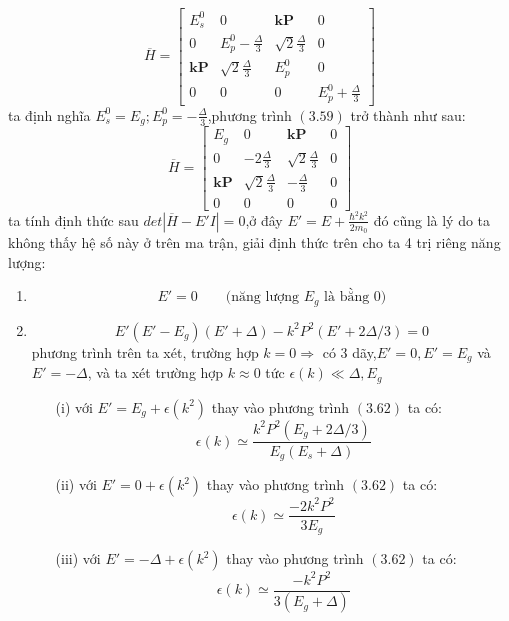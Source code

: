 \begin{equation}
\overline{H}=
\begin{bmatrix}
E_s^0  &0 &\mathbf{kP}  &0 \\
0& E_p^0 -\frac{\Delta}{3} &\sqrt{2}\frac{\Delta}{3} &0 \\
\mathbf{kP} &\sqrt{2}\frac{\Delta}{3} &E_p^0 &0 \\
0 &0 &0 &E_p^0+\frac{\Delta}{3} 
\end{bmatrix}
\end{equation}
ta định nghĩa $E_s^0=E_g;E_p^0=-\frac{\Delta}{3}$,phương trình $(3.59)$ trở thành như sau:
\begin{equation}
\overline{H}=
\begin{bmatrix}
E_g  &0 &\mathbf{kP}  &0 \\
0 &-2\frac{\Delta}{3} &\sqrt{2}\frac{\Delta}{3} &0 \\
\mathbf{kP} &\sqrt{2}\frac{\Delta}{3} &-\frac{\Delta}{3} &0 \\
0 &0 &0 &0 
\end{bmatrix}
\end{equation}
ta tính định thức sau $det|\overline{H}-E'I|=0$,ở đây $E'=E+\frac{\hbar^2 k^2}{2m_0}$ đó cũng là lý do ta không thấy hệ số này ở trên ma trận, giải định thức trên cho ta 4 trị riêng năng lượng:
\begin{enumerate}
\item \begin{equation}
E'=0 \qquad \text{(năng lượng $E_g$ là bằng 0)}
\end{equation}
\item \begin{equation}
E'(E'-E_g)(E'+\Delta) -k^2P^2(E'+2\Delta /3) =0
\end{equation}
phương trình trên ta xét, trường hợp $k=0 \Longrightarrow $ có 3 dãy,$E'=0,E'=E_g$ và $E'=-\Delta$, và ta xét trường hợp $k\approx0$ tức $\epsilon(k) \ll \Delta,E_g$
\begin{itemize}
\item[(i)] với $E'=E_g + \epsilon(k^2)$ thay vào phương trình $(3.62)$ ta có:
\begin{equation}
\epsilon(k) \simeq \frac{k^2P^2(E_g+2\Delta /3)}{E_g(E_s+\Delta)}
\end{equation}
\item[(ii)] với $E'=0+\epsilon(k^2)$ thay vào phương trình $(3.62)$ ta có:
\begin{equation}
\epsilon(k) \simeq \frac{-2k^2P^2}{3E_g}
\end{equation}
\item[(iii)] với $E'=-\Delta+\epsilon(k^2)$ thay vào phương trình $(3.62)$ ta có:
\begin{equation}
\epsilon(k) \simeq \frac{-k^2P^2}{3(E_g+\Delta)}
\end{equation}

\end{itemize}
\end{enumerate}
